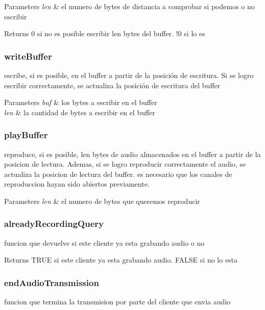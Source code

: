 \begin{DoxyParams}{Parameters}
{\em len} & el numero de bytes de distancia a comprobar si podemos o no escribir\\
\hline
\end{DoxyParams}
\begin{DoxyReturn}{Returns}
0 si no es posible escribir len bytes del buffer. !0 si lo es
\end{DoxyReturn}


 \hypertarget{writeBuffer}{}\subsubsection{write\-Buffer}\label{writeBuffer}
escribe, si es posible, en el buffer a partir de la posición de escritura. Si se logro escribir correctamente, se actualiza la posición de escritura del buffer


\begin{DoxyParams}{Parameters}
{\em buf} & los bytes a escribir en el buffer \\
\hline
{\em len} & la cantidad de bytes a escribir en el buffer\\
\hline
\end{DoxyParams}


 \hypertarget{playBuffer}{}\subsubsection{play\-Buffer}\label{playBuffer}
reproduce, si es posible, len bytes de audio almacenados en el buffer a partir de la posicion de lectura. Ademas, si se logro reproducir correctamente el audio, se actualiza la posicion de lectura del buffer. es necesario que los canales de reproduccion hayan sido abiertos previamente.


\begin{DoxyParams}{Parameters}
{\em len} & el numero de bytes que queremos reproducir\\
\hline
\end{DoxyParams}


 \hypertarget{alreadyRecordingQuery}{}\subsubsection{already\-Recording\-Query}\label{alreadyRecordingQuery}
funcion que devuelve si este cliente ya esta grabando audio o no

\begin{DoxyReturn}{Returns}
T\-R\-U\-E si este cliente ya esta grabando audio. F\-A\-L\-S\-E si no lo esta
\end{DoxyReturn}


 \hypertarget{endAudioTransmission}{}\subsubsection{end\-Audio\-Transmission}\label{endAudioTransmission}
funcion que termina la transmision por parte del cliente que envia audio



 